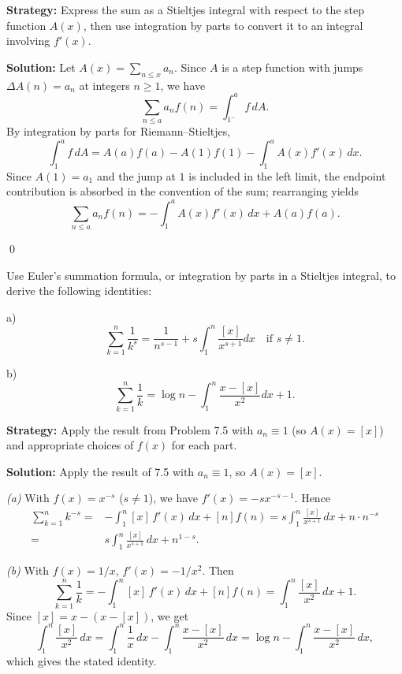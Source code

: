 \noindent\textbf{Strategy:} Express the sum as a Stieltjes integral with respect to the step function $A(x)$, then use integration by parts to convert it to an integral involving $f'(x)$.

\bigskip\noindent\textbf{Solution:}
Let $A(x)=\sum_{n\le x}a_n$. Since $A$ is a step function with jumps $\Delta A(n)=a_n$ at integers $n\ge 1$, we have
\[\sum_{n\le a} a_n f(n)=\int_{1^-}^{a} f\,dA.
\]
By integration by parts for Riemann–Stieltjes,
\[\int_{1}^{a} f\,dA= A(a)f(a)-A(1)f(1)-\int_{1}^{a} A(x) f'(x)\,dx.
\]
Since $A(1)=a_1$ and the jump at $1$ is included in the left limit, the endpoint contribution is absorbed in the convention of the sum; rearranging yields
\[\sum_{n\le a} a_n f(n)= -\int_{1}^{a} A(x) f'(x)\,dx + A(a)f(a).\]




\qed
\begin{problembox}
\begin{problemstatement}
Use Euler's summation formula, or integration by parts in a Stieltjes integral, to derive the following identities:

a) \[ \sum_{k=1}^n \frac{1}{k^s} = \frac{1}{n^{s-1}} + s \int_1^n \frac{[x]}{x^{s+1}} dx \quad \text{if } s \neq 1. \]

b) \[ \sum_{k=1}^n \frac{1}{k} = \log n - \int_1^n \frac{x - [x]}{x^2} dx + 1. \]
\end{problemstatement}
\end{problembox}

\noindent\textbf{Strategy:} Apply the result from Problem 7.5 with $a_n \equiv 1$ (so $A(x) = [x]$) and appropriate choices of $f(x)$ for each part.

\bigskip\noindent\textbf{Solution:}
Apply the result of 7.5 with $a_n\equiv 1$, so $A(x)=[x]$.

\textit{(a)} With $f(x)=x^{-s}$ ($s\ne 1$), we have $f'(x)=-s x^{-s-1}$. Hence
\begin{align*}
\sum_{k=1}^n k^{-s} =& -\int_1^n [x]\,f'(x)\,dx + [n] f(n) = s\int_1^n \frac{[x]}{x^{s+1}}\,dx + n\cdot n^{-s} \\
=& s\int_1^n \frac{[x]}{x^{s+1}}\,dx + n^{1-s}.
\end{align*}

\textit{(b)} With $f(x)=1/x$, $f'(x)=-1/x^2$. Then
\[\sum_{k=1}^n \frac{1}{k} = -\int_1^n [x]\,f'(x)\,dx + [n]f(n) = \int_1^n \frac{[x]}{x^2}\,dx + 1.
\]
Since $[x]=x-(x-[x])$, we get
\[\int_1^n \frac{[x]}{x^2}\,dx = \int_1^n \frac{1}{x}\,dx - \int_1^n \frac{x-[x]}{x^2}\,dx = \log n - \int_1^n \frac{x-[x]}{x^2}\,dx,
\]
which gives the stated identity.




